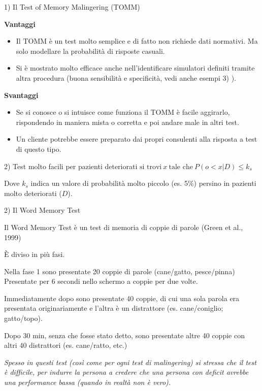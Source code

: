 \documentclass[
  ignorenonframetext,
  aspectratio=169,
]{beamer}
\providecommand{\tightlist}{%
  \setlength{\itemsep}{0pt}\setlength{\parskip}{0pt}}
\begin{document}
\begin{frame}{1) Il Test of Memory Malingering (TOMM)}
\label{il-test-of-memory-malingering-tomm-3}
\small

\textbf{Vantaggi}

\begin{itemize}
\tightlist
\item
  Il TOMM è un test molto semplice e di fatto non richiede dati
  normativi. Ma solo modellare la probabilità di risposte casuali.
\item
  Si è mostrato molto efficace anche nell'identificare simulatori
  definiti tramite altra procedura (buona sensibilità e specificità,
  vedi anche esempi 3) ).
\end{itemize}

\textbf{Svantaggi}

\begin{itemize}
\tightlist
\item
  Se si conosce o si intuisce come funziona il TOMM è facile aggirarlo,
  rispondendo in maniera mista o corretta e poi andare male in altri
  test.
\item
  Un cliente potrebbe essere preparato dai propri consulenti alla
  risposta a test di questo tipo.
\end{itemize}
\end{frame}

\begin{frame}{2) Test molto facili per pazienti deteriorati}
\label{test-molto-facili-per-pazienti-deteriorati}
\vfill
{\center
$\text{si trovi}\ x\ \text{tale che}\ P(o < x | D) \leq k_s$
\vfill
}

Dove \(k_s\) indica un valore di probabilità molto piccolo (es. 5\%)
persino in pazienti molto deteriorati (\(D\)).
\end{frame}

\begin{frame}{2) Il Word Memory Test}
\label{il-word-memory-test}
\small

Il Word Memory Test è un test di memoria di coppie di parole (Green et
al., 1999)

È diviso in più fasi.

Nella fase 1 sono presentate 20 coppie di parole (cane/gatto,
pesce/pinna) Presentate per 6 secondi nello schermo a coppie per due
volte.

Immediatamente dopo sono presentate 40 coppie, di cui una sola parola
era presentata originariamente e l'altra è un distrattore (es.
cane/coniglio; gatto/topo).

Dopo 30 min, senza che fosse stato detto, sono presentate altre 40
coppie con altri 40 distrattori (es. cane/ratto, etc.)

\emph{Spesso in questi test (così come per ogni test di malingering) si
stressa che il test è difficile, per indurre la persona a credere che
una persona con deficit avrebbe una performance bassa (quando in realtà
non è vero).}
\end{frame}
\end{document}
